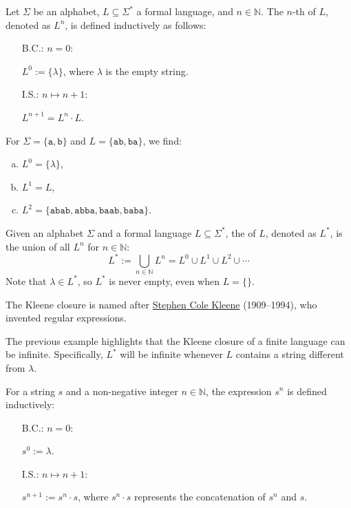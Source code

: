 \begin{Definition}
Let $ \Sigma $ be an alphabet, $ L \subseteq \Sigma^* $ a formal language, and $ n \in \mathbb{N} $. The $ n $-th  of $ L $, denoted as $ L^n $, is defined inductively as follows:
\begin{enumerate}
\item[B.C.:] $ n = 0 $:

             $ L^0 := \{ \lambda \} $, \quad where $ \lambda $ is the empty string.
\item[I.S.:] $ n \mapsto n + 1 $:
             
             $ L^{n+1} = L^n \cdot L $. \eox
\end{enumerate}
\end{Definition}

\exampleEng
For $ \Sigma = \{ \texttt{a}, \texttt{b} \} $ and $ L = \{ \texttt{ab}, \texttt{ba} \} $, we find:
\begin{enumerate}[(a)]
\item $ L^0 = \{ \lambda \} $,
\item $ L^1 = L $,
\item $ L^2 = \{ \texttt{abab}, \texttt{abba}, \texttt{baab}, \texttt{baba} \} $. \eox
\end{enumerate}

\begin{Definition}
  Given an alphabet $ \Sigma $ and a formal language $ L \subseteq \Sigma^* $, the  of $ L $, denoted as $ L^* $, is the union of all $ L^n $ for $ n \in \mathbb{N} $:
  \[
  L^* := \bigcup_{n \in \mathbb{N}} L^n = L^0 \cup L^1 \cup L^2 \cup \cdots
  \]
  Note that $ \lambda \in L^* $, so $ L^* $ is never empty, even when $ L = \{\} $.

  The Kleene closure is named after \href{https://en.wikipedia.org/wiki/Stephen_Cole_Kleene}{Stephen Cole Kleene}
  (1909--1994), who invented regular expressions.
  \eox
\end{Definition}

The previous example highlights that the Kleene closure of a finite language can be infinite. Specifically, 
$L^*$ will be infinite whenever $L$ contains a string different from $\lambda$. 

\begin{Definition}
For a string $ s $ and a non-negative integer $ n \in \mathbb{N} $, the expression $ s^n $ is defined inductively:
\begin{enumerate}
\item[B.C.:] $ n = 0 $:

             $ s^0 := \lambda $.
\item[I.S.:] $ n \mapsto n + 1 $:

             $ s^{n+1} := s^n \cdot s $,  \quad where $ s^n \cdot s $ represents the concatenation of $ s^n $ and $ s $.
\eox
\end{enumerate}
\end{Definition}

